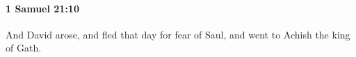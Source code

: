 
		\paragraph{1 Samuel 21:10} %
			\label{1SAMUEL-21-10}

			And David arose, and fled that day for fear of Saul, and went to Achish the king of Gath.


